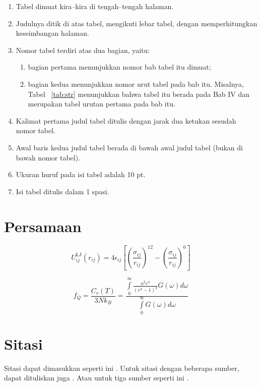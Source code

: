 \begin{enumerate}
  \item Tabel dimuat kira–kira di tengah–tengah halaman.
  \item Judulnya ditik di atas tabel, mengikuti lebar tabel, dengan memperhitungkan keseimbangan halaman.
  \item Nomor tabel terdiri atas dua bagian, yaitu:
  \begin{enumerate}[label=(\alph*)]
    \item bagian pertama menunjukkan nomor bab tabel itu dimuat;
    \item bagian kedua menunjukkan nomor urut tabel pada bab itu. Misalnya, Tabel ~\ref{tab:str} menunjukkan bahwa tabel itu berada pada Bab IV dan merupakan tabel urutan pertama pada bab itu.
  \end{enumerate}
  \item Kalimat pertama judul tabel ditulis dengan jarak dua ketukan sesudah nomor tabel.
  \item Awal baris kedua judul tabel berada di bawah awal judul tabel (bukan di bawah nomor tabel).
  \item Ukuran huruf pada isi tabel adalah 10 pt.
  \item Isi tabel ditulis dalam 1 spasi.
\end{enumerate}

\section{Persamaan}

\begin{equation}
  U_{i j}^{\mathrm{LJ}}\left(r_{i j}\right)=4 \epsilon_{i j}\left[\left(\frac{\sigma_{i j}}{r_{i j}}\right)^{12}-\left(\frac{\sigma_{i j}}{r_{i j}}\right)^{6}\right]
\end{equation}

\begin{equation}
  f_{Q}=\frac{C_v(T)}{3Nk_B}=\frac{\displaystyle\int\limits_{0}^{\infty}\frac{u^2e^u}{{(e^u-1)}^2}G(\omega)d\omega}{\displaystyle\int\limits_{0}^{\infty}G(\omega)d\omega}
\end{equation}

\section{Sitasi}
Sitasi dapat dimasukkan seperti ini \cite{moore1998cramming}. Untuk sitasi dengan beberapa sumber, dapat dituliskan juga \cite{wang2020frank,zhang2020molecular}. Atau untuk tiga sumber seperti ini \cite{mcgaughey2019phonon,jiang2015graphene,khan2015equilibrium}.
